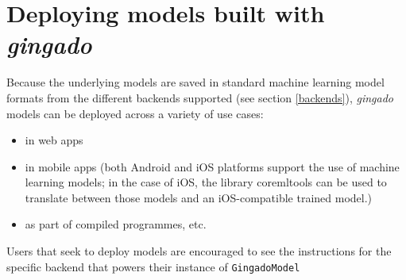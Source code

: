 \documentclass{article}
\begin{document}








\section{Deploying models built with \textit{gingado}}

Because the underlying models are saved in standard machine learning model formats from the different backends supported (see section \ref{backends}), \textit{gingado} models can be deployed across a variety of use cases:
\begin{itemize}
    \item in web apps
    \item in mobile apps (both Android and iOS platforms support the use of machine learning models; in the case of iOS, the library coremltools can be used to translate between those models and an iOS-compatible trained model.)
    \item as part of compiled programmes, etc.
\end{itemize}

Users that seek to deploy models are encouraged to see the instructions for the specific backend that powers their instance of \texttt{GingadoModel}

%
%
\printbibliography
\end{document}
